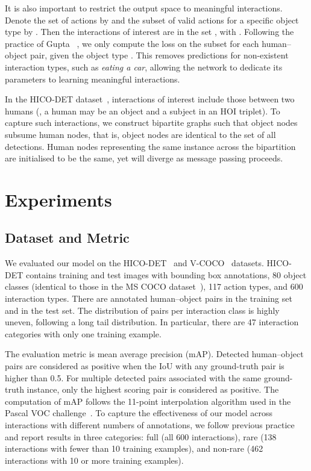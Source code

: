 \documentclass[10pt,twocolumn,letterpaper]{article}
\begin{document}
It is also important to restrict the output space to meaningful interactions. Denote the set of actions by  and the subset of valid actions for a specific object type  by . Then the interactions of interest are in the set , with . Following the practice of Gupta \etal~\cite{gupta2019}, we only compute the loss on the subset  for each human--object pair, given the object type . This removes predictions for non-existent interaction types, such as \textit{eating a car}, allowing the network to dedicate its parameters to learning meaningful interactions.

In the HICO-DET dataset~\cite{chao2018}, interactions of interest include those between two humans (\ie, a human may be an object and a subject in an HOI triplet). To capture such interactions, we construct bipartite graphs such that object nodes subsume human nodes, that is, object nodes are identical to the set of all detections. Human nodes representing the same instance across the bipartition are initialised to be the same, yet will diverge as message passing proceeds.

\section{Experiments}

\subsection{Dataset and Metric}

We evaluated our model on the HICO-DET~\cite{chao2018} and V-COCO~\cite{gupta2015} datasets.
HICO-DET contains  training and  test images with bounding box annotations, 80 object classes (identical to those in the MS COCO dataset~\cite{lin2014}), 117 action types, and 600 interaction types.
There are  annotated human--object pairs in the training set and  in the test set.
The distribution of pairs per interaction class is highly uneven, following a long tail distribution. In particular, there are 47 interaction categories with only one training example.

The evaluation metric is mean average precision (mAP). Detected human--object pairs are considered as positive when the IoU with any ground-truth pair is higher than 0.5. For multiple detected pairs associated with the same ground-truth instance, only the highest scoring pair is considered as positive. The computation of mAP follows the 11-point interpolation algorithm used in the Pascal VOC challenge~\cite{everingham2014}.
To capture the effectiveness of our model across interactions with different numbers of annotations, we follow previous practice~\cite{chao2018} and report results in three categories: full (all 600 interactions), rare (138 interactions with fewer than 10 training examples), and non-rare (462 interactions with 10 or more training examples).
\end{document}
